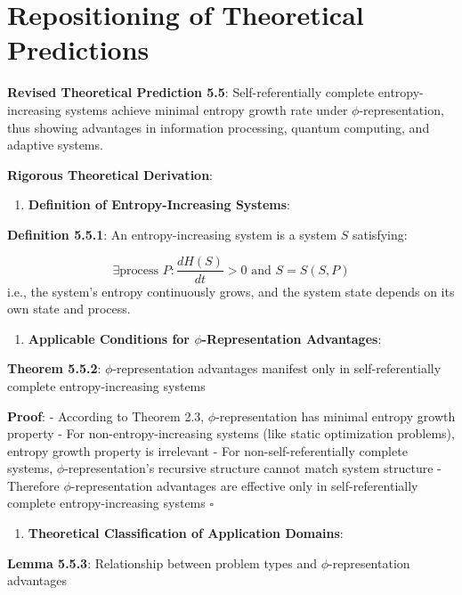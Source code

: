 \section{Repositioning of Theoretical Predictions}
\label{sec:ch05_applications:repositioning-of-theoretical-predictions}

\textbf{Revised Theoretical Prediction 5.5}: Self-referentially complete entropy-increasing systems achieve minimal entropy growth rate under $\phi$-representation, thus showing advantages in information processing, quantum computing, and adaptive systems.

\textbf{Rigorous Theoretical Derivation}:

\begin{enumerate}
\item \textbf{Definition of Entropy-Increasing Systems}:
\end{enumerate}
   \textbf{Definition 5.5.1}: An entropy-increasing system is a system $S$ satisfying:
\label{def:5.5.1}
   
\begin{equation}
\exists \text{process } P: \frac{dH(S)}{dt} > 0 \text{ and } S = S(S, P)
\end{equation}
   i.e., the system's entropy continuously grows, and the system state depends on its own state and process.

\begin{enumerate}
\item \textbf{Applicable Conditions for $\phi$-Representation Advantages}:
\end{enumerate}
   \textbf{Theorem 5.5.2}: $\phi$-representation advantages manifest only in self-referentially complete entropy-increasing systems
\label{thm:5.5.2}
   
   \textbf{Proof}:
   - According to Theorem 2.3, $\phi$-representation has minimal entropy growth property
   - For non-entropy-increasing systems (like static optimization problems), entropy growth property is irrelevant
   - For non-self-referentially complete systems, $\phi$-representation's recursive structure cannot match system structure
   - Therefore $\phi$-representation advantages are effective only in self-referentially complete entropy-increasing systems $\square$

\begin{enumerate}
\item \textbf{Theoretical Classification of Application Domains}:
\end{enumerate}
   \textbf{Lemma 5.5.3}: Relationship between problem types and $\phi$-representation advantages
\label{lemma:5.5.3}
   
